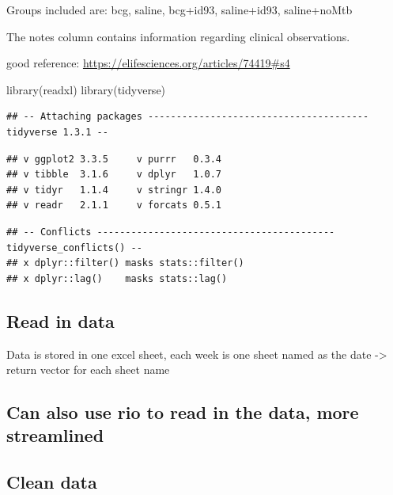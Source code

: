 \documentclass[
]{book}
\newenvironment{Shaded}{\begin{snugshade}}{\end{snugshade}}
\newcommand{\FunctionTok}[1]{\textcolor[rgb]{0.00,0.00,0.00}{#1}}
\newcommand{\NormalTok}[1]{#1}
\begin{document}
Groups included are: bcg, saline, bcg+id93, saline+id93, saline+noMtb

The notes column contains information regarding clinical observations.

good reference: \url{https://elifesciences.org/articles/74419\#s4}

\begin{Shaded}
\begin{Highlighting}[]
\FunctionTok{library}\NormalTok{(readxl)}
\FunctionTok{library}\NormalTok{(tidyverse)}
\end{Highlighting}
\end{Shaded}

\begin{verbatim}
## -- Attaching packages --------------------------------------- tidyverse 1.3.1 --
\end{verbatim}

\begin{verbatim}
## v ggplot2 3.3.5     v purrr   0.3.4
## v tibble  3.1.6     v dplyr   1.0.7
## v tidyr   1.1.4     v stringr 1.4.0
## v readr   2.1.1     v forcats 0.5.1
\end{verbatim}

\begin{verbatim}
## -- Conflicts ------------------------------------------ tidyverse_conflicts() --
## x dplyr::filter() masks stats::filter()
## x dplyr::lag()    masks stats::lag()
\end{verbatim}

\hypertarget{read-in-data}{%
\subsection{Read in data}\label{read-in-data}}

Data is stored in one excel sheet, each week is one sheet named as the date -\textgreater{} return vector for each sheet name

\hypertarget{can-also-use-rio-to-read-in-the-data-more-streamlined}{%
\subsection{Can also use rio to read in the data, more streamlined}\label{can-also-use-rio-to-read-in-the-data-more-streamlined}}

\hypertarget{clean-data}{%
\subsection{Clean data}\label{clean-data}}
\end{document}
